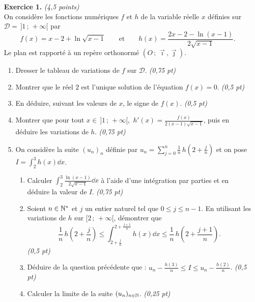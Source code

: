 \noindent\textbf{Exercice 1.} \hfill\textit{(4,5 points)}\\
On considère les fonctions numériques $f$ et $h$ de la variable réelle $x$ définies sur
$\mathcal D=\,]1\,;\,+\infty[$ par
\[
f(x)=x-2+\ln\sqrt{x-1}
\qquad\text{et}\qquad
h(x)=\frac{2x-2-\ln(x-1)}{2\sqrt{x-1}}.
\]
Le plan est rapporté à un repère orthonormé $(O\,;\,\vec\imath,\vec\jmath)$.
\begin{enumerate}[label=\arabic*)]
\item Dresser le tableau de variations de $f$ sur $\mathcal D$. \hfill\textit{(0,75 pt)}
\item Montrer que le réel $2$ est l'unique solution de l'équation $f(x)=0$. \hfill\textit{(0,5 pt)}
\item En déduire, suivant les valeurs de $x$, le signe de $f(x)$. \hfill\textit{(0,5 pt)}
\item Montrer que pour tout $x\in\,]1\,;\,+\infty[$,\ $\displaystyle h'(x)=\frac{f(x)}{2(x-1)\sqrt{x-1}}$,
puis en déduire les variations de $h$. \hfill\textit{(0,75 pt)}
\item On considère la suite $(u_n)_n$ définie par
$\displaystyle u_n=\sum_{j=0}^{n}\frac1n\,h\!\left(2+\frac jn\right)$ et on pose
$\displaystyle I=\int_2^3 h(x)\dd x$.
  \begin{enumerate}[label=\alph*)]
  \item Calculer $\displaystyle\int_2^3 \frac{\ln(x-1)}{2\sqrt{x-1}}\dd x$ à l'aide d'une intégration
  par parties et en déduire la valeur de $I$. \hfill\textit{(0,75 pt)}
  \item Soient $n\in\mathbb{N}^*$ et $j$ un entier naturel tel que $0\le j\le n-1$. En utilisant les
  variations de $h$ sur $[2\,;\,+\infty[$, démontrer que
  \[
  \frac1n\,h\!\left(2+\frac jn\right)\le\int_{2+\frac jn}^{2+\frac{j+1}{n}}h(x)\dd x\le\frac1n\,h\!\left(2+\frac{j+1}{n}\right).
  \]
  \hfill\textit{(0,5 pt)}
  \item Déduire de la question précédente que :
  $\displaystyle u_n-\frac{h(3)}{n}\le I\le u_n-\frac{h(2)}{n}$. \hfill\textit{(0,5 pt)}
  \item Calculer la limite de la suite $(u_n)_{n\in\mathbb{N}}$. \hfill\textit{(0,25 pt)}
  \end{enumerate}
\end{enumerate}

